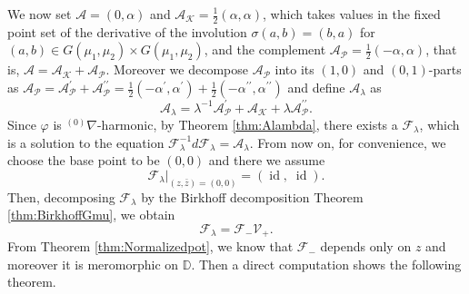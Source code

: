 \documentclass[12pt]{amsart}
\theoremstyle{definition}
\theoremstyle{remark}
\numberwithin{equation}{section}
\begin{document}
 We now set ${\mathcal A} = (0,\alpha)$ and ${\mathcal A}_{\mathcal K} = \frac{1}{2}(\alpha, \alpha)$, which takes 
 values in
 the fixed point set of the derivative of the involution $\sigma (a, b) = (b, a)$ for $
 (a, b) \in G(\mu_1, \mu_2) \times G(\mu_1, \mu_2)$, and the complement ${\mathcal A}_{\mathcal P} = 
 \frac{1}{2}(-\alpha, \alpha)$, that is, ${\mathcal A} = {\mathcal A}_{\mathcal K} + {\mathcal A}_{\mathcal P}$. Moreover 
 we decompose ${\mathcal A}_{\mathcal P}$ into its $(1,0)$ and $(0,1)$-parts as 
 ${\mathcal A}_{\mathcal P} = {\mathcal A}_{\mathcal P}^{\prime} + {\mathcal A}_{\mathcal P}^{\prime \prime}  = \frac{1}{2}
  ( -\alpha^{\prime}, \alpha^{\prime}) 
 + \frac{1}{2}  ( -\alpha^{\prime \prime}, \alpha^{\prime \prime})$
 and define ${\mathcal A}_{\lambda}$ as 
\begin{equation*}
 {\mathcal A}_{\lambda} = {\lambda}^{-1} {\mathcal A}_{\mathcal P}^{\prime} + {\mathcal A}_{\mathcal K} + {\lambda} {\mathcal A}_{\mathcal P}^{\prime \prime}.
\end{equation*}
 Since $\varphi$ is ${{}^{(0)}\nabla}$-harmonic, by Theorem \ref{thm:Alambda}, there exists a 
 ${\mathcal F}_{\lambda}$, which is a solution to the equation ${\mathcal F}_{\lambda}^{-1} d {\mathcal F}_{\lambda} = {\mathcal A}_{\lambda}$.  
 From now on, for convenience, we choose the base point to be $(0, 0)$  and there we assume 
 \begin{equation}\label{eq:initialzbarz}
 {\mathcal F}_{\lambda}|_{(z, \bar z) =(0,0)} = ({\operatorname{id}},\; {\operatorname{id}}).
 \end{equation}
 Then, decomposing ${\mathcal F}_{\lambda}$ by the Birkhoff decomposition Theorem \ref{thm:BirkhoffGmu}, 
 we obtain  
 \begin{equation}\label{eq:BirkofF}
 {\mathcal F}_{\lambda} = {\mathcal F}_{-} {\mathcal V}_{+}.
 \end{equation}
 From Theorem \ref{thm:Normalizedpot}, we know that ${\mathcal F}_{-}$ depends only on $z$ and moreover 
 it is meromorphic on ${\mathbb D}$. 
 Then a direct computation shows the following theorem.
\end{document}

